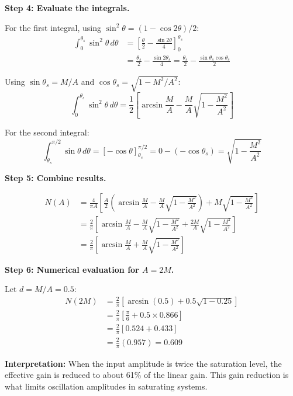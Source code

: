 \begin{example}
\textbf{Step 4: Evaluate the integrals.}

For the first integral, using $\sin^2\theta = (1 - \cos 2\theta)/2$:
\begin{align}
\int_0^{\theta_s} \sin^2\theta \, d\theta &= \left[\frac{\theta}{2} - \frac{\sin 2\theta}{4}\right]_0^{\theta_s} \\
&= \frac{\theta_s}{2} - \frac{\sin 2\theta_s}{4} = \frac{\theta_s}{2} - \frac{\sin\theta_s \cos\theta_s}{2}
\end{align}

Using $\sin\theta_s = M/A$ and $\cos\theta_s = \sqrt{1 - M^2/A^2}$:
\begin{equation}
\int_0^{\theta_s} \sin^2\theta \, d\theta = \frac{1}{2}\left[\arcsin\frac{M}{A} - \frac{M}{A}\sqrt{1-\frac{M^2}{A^2}}\right]
\end{equation}

For the second integral:
\begin{equation}
\int_{\theta_s}^{\pi/2} \sin\theta \, d\theta = [-\cos\theta]_{\theta_s}^{\pi/2} = 0 - (-\cos\theta_s) = \sqrt{1-\frac{M^2}{A^2}}
\end{equation}

\textbf{Step 5: Combine results.}

\begin{align}
N(A) &= \frac{4}{\pi A}\left[\frac{A}{2}\left(\arcsin\frac{M}{A} - \frac{M}{A}\sqrt{1-\frac{M^2}{A^2}}\right) + M\sqrt{1-\frac{M^2}{A^2}}\right] \\
&= \frac{2}{\pi}\left[\arcsin\frac{M}{A} - \frac{M}{A}\sqrt{1-\frac{M^2}{A^2}} + \frac{2M}{A}\sqrt{1-\frac{M^2}{A^2}}\right] \\
&= \frac{2}{\pi}\left[\arcsin\frac{M}{A} + \frac{M}{A}\sqrt{1-\frac{M^2}{A^2}}\right]
\end{align}

\textbf{Step 6: Numerical evaluation for $A = 2M$.}

Let $d = M/A = 0.5$:
\begin{align}
N(2M) &= \frac{2}{\pi}\left[\arcsin(0.5) + 0.5\sqrt{1-0.25}\right] \\
&= \frac{2}{\pi}\left[\frac{\pi}{6} + 0.5 \times 0.866\right] \\
&= \frac{2}{\pi}\left[0.524 + 0.433\right] \\
&= \frac{2}{\pi}(0.957) = 0.609
\end{align}

\textbf{Interpretation:} When the input amplitude is twice the saturation level, the effective gain is reduced to about 61\% of the linear gain. This gain reduction is what limits oscillation amplitudes in saturating systems.
\end{example}

